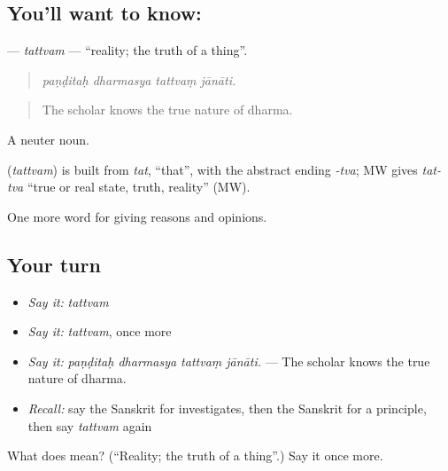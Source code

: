 \subsection*{You'll want to know: }
\textbf{} — \emph{tattvam} — \textquotedblleft{}reality; the truth of a thing\textquotedblright{}.

\begin{quote}
   
\end{quote}

\begin{quote}
\emph{paṇḍitaḥ dharmasya tattvaṃ jānāti.}
\end{quote}

\begin{quote}
The scholar knows the true nature of dharma.
\end{quote}

A neuter noun.

\begin{cousinweb}
\textbf{} (\emph{tattvam}) is built from \emph{tat}, \textquotedblleft{}that\textquotedblright{}, with the abstract ending \emph{-tva}; MW gives \emph{tat-tva} \textquotedblleft{}true or real state, truth, reality\textquotedblright{} (MW).
\end{cousinweb}

\begin{grammarlens}[title={What you've built}]
One more word for giving reasons and opinions.
\end{grammarlens}

\subsection*{Your turn}
\begin{itemize}
\raggedright
  \item \emph{Say it:} \emph{tattvam}
  \item \emph{Say it:} \emph{tattvam}, once more
  \item \emph{Say it:} \emph{paṇḍitaḥ dharmasya tattvaṃ jānāti.} — The scholar knows the true nature of dharma.
  \item \emph{Recall:} say the Sanskrit for investigates, then the Sanskrit for a principle, then say \emph{tattvam} again
\end{itemize}

\begin{tcolorbox}[breakable,colback=teal!4,colframe=teal!35!black,title={Before you move on}]
What does  mean? (\textquotedblleft{}Reality; the truth of a thing\textquotedblright{}.) Say it once more.
\end{tcolorbox}
